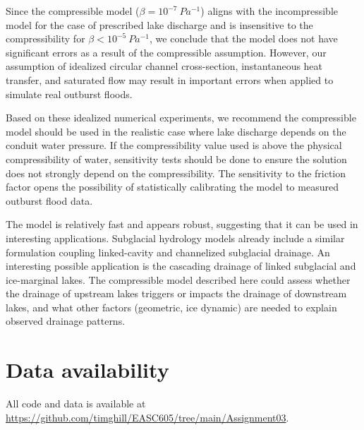 \documentclass[11pt]{article}
\begin{document}
Since the compressible model ($\beta = 10^{-7}\SI{}{Pa^{-1}}$) aligns with the incompressible model for the case of prescribed lake discharge and is insensitive to the compressibility for $\beta < 10^{-5}\SI{}{Pa^{-1}}$, we conclude that the model does not have significant errors as a result of the compressible assumption. However, our assumption of idealized circular channel cross-section, instantaneous heat transfer, and saturated flow may result in important errors when applied to simulate real outburst floods.

Based on these idealized numerical experiments, we recommend the compressible model should be used in the realistic case where lake discharge depends on the conduit water pressure. If the compressibility value used is above the physical compressibility of water, sensitivity tests should be done to ensure the solution does not strongly depend on the compressibility. The sensitivity to the friction factor opens the possibility of statistically calibrating the model to measured outburst flood data.

The model is relatively fast and appears robust, suggesting that it can be used in interesting applications. Subglacial hydrology models \citep[e.g.][]{werder2013} already include a similar formulation coupling linked-cavity and channelized subglacial drainage. An interesting possible application is the cascading drainage of linked subglacial and ice-marginal lakes. The compressible model described here could assess whether the drainage of upstream lakes triggers or impacts the drainage of downstream lakes, and what other factors (geometric, ice dynamic) are needed to explain observed drainage patterns.

\section*{Data availability}
All code and data is available at \url{https://github.com/timghill/EASC605/tree/main/Assignment03}.




\clearpage
\appendix
\end{document}
